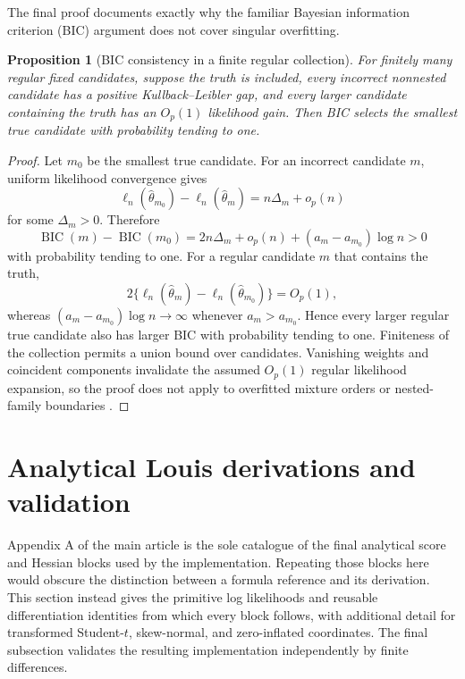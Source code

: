 \documentclass[a4paper,fleqn]{cas-sc}
\newtheorem{proposition}[theorem]{Proposition}
\numberwithin{equation}{section}
\begin{document}
The final proof documents exactly why the familiar Bayesian information criterion (BIC) argument does not cover singular overfitting.

\begin{proposition}[BIC consistency in a finite regular collection]
\label{supp:prop-bic}
For finitely many regular fixed candidates, suppose the truth is included, every incorrect nonnested candidate has a positive Kullback--Leibler gap, and every larger candidate containing the truth has an $O_p(1)$ likelihood gain. Then BIC selects the smallest true candidate with probability tending to one.
\end{proposition}

\begin{proof}
Let $m_0$ be the smallest true candidate. For an incorrect candidate $m$, uniform likelihood convergence gives
\[
 \ell_n(\widehat\theta_{m_0})-\ell_n(\widehat\theta_m)
 =n\Delta_m+o_p(n)
\]
for some $\Delta_m>0$. Therefore
\[
 \operatorname{BIC}(m)-\operatorname{BIC}(m_0)
 =2n\Delta_m+o_p(n)+(a_m-a_{m_0})\log n>0
\]
with probability tending to one. For a regular candidate $m$ that contains the truth,
\[
 2\{\ell_n(\widehat\theta_m)-\ell_n(\widehat\theta_{m_0})\}=O_p(1),
\]
whereas $(a_m-a_{m_0})\log n\to\infty$ whenever $a_m>a_{m_0}$. Hence every larger regular true candidate also has larger BIC with probability tending to one. Finiteness of the collection permits a union bound over candidates. Vanishing weights and coincident components invalidate the assumed $O_p(1)$ regular likelihood expansion, so the proof does not apply to overfitted mixture orders or nested-family boundaries \citep{keribin2000order,drton2017sbic}.
\end{proof}

\section{Analytical Louis derivations and validation}
\label{supp:derivatives}

Appendix A of the main article is the sole catalogue of the final analytical score and Hessian blocks used by the implementation. Repeating those blocks here would obscure the distinction between a formula reference and its derivation. This section instead gives the primitive log likelihoods and reusable differentiation identities from which every block follows, with additional detail for transformed Student-$t$, skew-normal, and zero-inflated coordinates. The final subsection validates the resulting implementation independently by finite differences.
\end{document}
